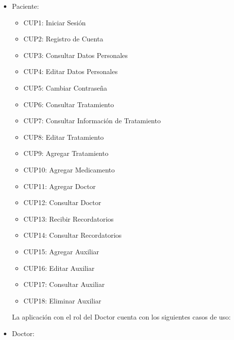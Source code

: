 \begin{itemize}
	\item Paciente:
		\begin{itemize}
			\item CUP1: Iniciar Sesión
			\item CUP2: Registro de Cuenta
			\item CUP3: Consultar Datos Personales
			\item CUP4: Editar Datos Personales
			\item CUP5: Cambiar Contraseña
			\item CUP6: Consultar Tratamiento
			\item CUP7: Consultar Información de Tratamiento
			\item CUP8: Editar Tratamiento
			\item CUP9: Agregar Tratamiento
			\item CUP10: Agregar Medicamento
			\item CUP11: Agregar Doctor
			\item CUP12: Consultar Doctor
			\item CUP13: Recibir Recordatorios
			\item CUP14: Consultar Recordatorios
			\item CUP15: Agregar Auxiliar
			\item CUP16: Editar Auxiliar
			\item CUP17: Consultar Auxiliar
			\item CUP18: Eliminar Auxiliar
		\end{itemize}
	

	
La aplicación con el rol del Doctor cuenta con los siguientes casos de uso:	 
	
	\item Doctor:
		\begin{itemize}
		

\end{itemize}
\end{itemize}
